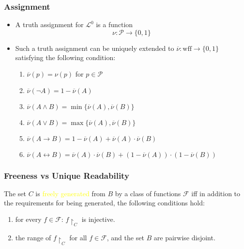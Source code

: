 \documentclass[UTF8,aspectratio=43,11pt,colorlinks,compress,openany]{beamer}%
\begin{document}
\begin{frame}\frametitle{Assignment}
	\begin{itemize}
		\item A truth assignment for $\mathscr{L}^0$ is a function
		\[\nu:\mathcal{P}\to\{0,1\}\]
		\item Such a truth assignment can be uniquely extended to $\overline{\nu}:\mathrm{wff}\to\{0,1\}$ satisfying the following condition:\\
		\begin{enumerate}
			\item $\overline{\nu}(p)=\nu(p)$ for $p\in\mathcal{P}$
			\item $\overline{\nu}(\neg A)=1-\overline{\nu}(A)$
			\item $\overline{\nu}(A\wedge B)=\min\{\overline{\nu}(A),\overline{\nu}(B)\}$
			\item $\overline{\nu}(A\vee B)=\max\{\overline{\nu}(A),\overline{\nu}(B)\}$
			\item $\overline{\nu}(A\to B)=1-\overline{\nu}(A)+\overline{\nu}(A)\cdot\overline{\nu}(B)$
			\item $\overline{\nu}(A\leftrightarrow B)=\overline{\nu}(A)\cdot\overline{\nu}(B)+(1-\overline{\nu}(A))\cdot(1-\overline{\nu}(B))$
		\end{enumerate}
	\end{itemize}
\end{frame}

\begin{frame}\frametitle{Freeness vs Unique Readability}
	\begin{definition}
		The set $C$ is \textcolor{yellow}{freely generated} from $B$ by a class of functions $\mathcal{F}$ iff in addition to the requirements for being generated, the following conditions hold:
		\begin{enumerate}
			\item for every $f\in\mathcal{F}$: $f{\restriction_C}$ is injective.
			\item the range of $f{\restriction_C}$ for all $f\in\mathcal{F}$, and the set $B$ are pairwise disjoint.
		\end{enumerate}
	\end{definition}
\end{frame}
\end{document}
